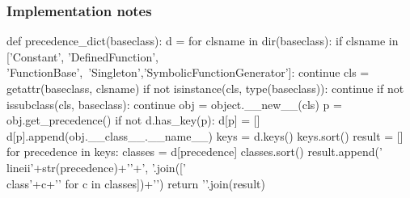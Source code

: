\documentclass[a4paper,12pt]{article}
\begin{document}
\subsubsection{Implementation notes}
\label{sec:impl.classes}

\begin{python*}
def precedence_dict(baseclass):
    d = {}
    for clsname in dir(baseclass):
        if clsname in ['Constant', 'DefinedFunction', 'FunctionBase',\
        'Singleton','SymbolicFunctionGenerator']:
            continue
        cls = getattr(baseclass, clsname)
        if not isinstance(cls, type(baseclass)): continue
        if not issubclass(cls, baseclass): continue
        obj = object.__new__(cls)
        p = obj.get_precedence()
        if not d.has_key(p): d[p] = []
        d[p].append(obj.__class__.__name__)
    keys = d.keys()
    keys.sort()
    result = []
    for precedence in keys:
        classes = d[precedence]
        classes.sort()
        result.append('\\lineii{'+str(precedence)+'}{'+', '.join(['\\class{'+c+'}' for c in classes])+'}')
    return '\n'.join(result)

\end{python*}
\end{document}

